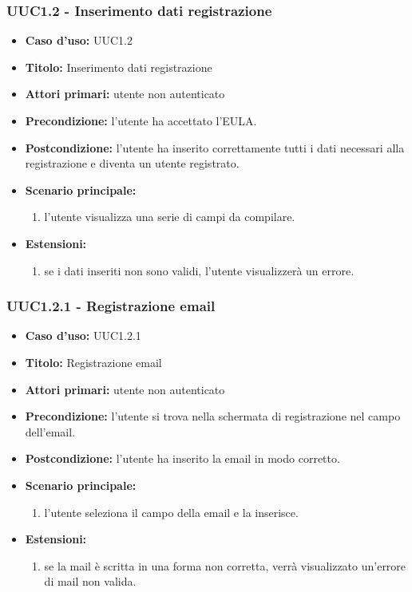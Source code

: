 \documentclass[casi-duso]{subfiles}
\begin{document}
\subsubsection{UUC1.2 - Inserimento dati registrazione}%
\label{subsub:UUC1.2utente}
\begin{itemize}
  \item \textbf{Caso d’uso:} UUC1.2
  \item \textbf{Titolo:} Inserimento dati registrazione
  \item \textbf{Attori primari:} utente non autenticato
  \item \textbf{Precondizione:} l'utente ha accettato l'EULA.
  \item \textbf{Postcondizione:} l'utente ha inserito correttamente tutti i dati necessari alla registrazione e diventa un utente registrato.
  \item \textbf{Scenario principale:}
        \begin{enumerate}
          \item l'utente visualizza una serie di campi da compilare.
        \end{enumerate}
  \item \textbf{Estensioni:}
        \begin{enumerate}
          \item se i dati inseriti non sono validi, l'utente visualizzerà un errore.
        \end{enumerate}
\end{itemize}

\subsubsection{UUC1.2.1 - Registrazione email}%
\label{subsub:UUC1.2.1utente}
\begin{itemize}
  \item \textbf{Caso d’uso:} UUC1.2.1
  \item \textbf{Titolo:} Registrazione email
  \item \textbf{Attori primari:} utente non autenticato
  \item \textbf{Precondizione:} l'utente si trova nella schermata di registrazione nel campo dell'email.
  \item \textbf{Postcondizione:} l'utente ha inserito la email in modo corretto.
  \item \textbf{Scenario principale:}
        \begin{enumerate}
          \item l'utente seleziona il campo della email e la inserisce.
        \end{enumerate}
  \item \textbf{Estensioni:}
        \begin{enumerate}
          \item se la mail è scritta in una forma non corretta, verrà visualizzato un'errore di mail non valida.
        \end{enumerate}
\end{itemize}
\end{document}
